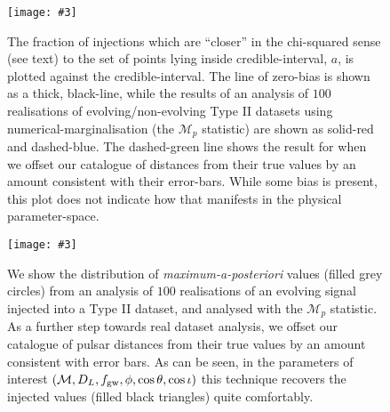 \documentclass[twocolappendix,tighten]{emulateapj}
\newcommand{\incgraph}[3]{\texttt{[image: \#3]}}
\begin{document}
\begin{figure}
  \centering
  \incgraph{0}{0.5}{P-P_plot_Version4.pdf}
   \caption{\label{fig:T4pp}The fraction of injections which are ``closer'' in the chi-squared sense (see text) to the set of points lying inside credible-interval, $a$, is plotted against the credible-interval. The line of zero-bias is shown as a thick, black-line, while the results of an analysis of $100$ realisations of evolving/non-evolving Type II datasets using numerical-marginalisation (the {\bf $\mathcal{M}_p$} statistic) are shown as solid-red and dashed-blue. The dashed-green line shows the result for when we offset our catalogue of distances from their true values by an amount consistent with their error-bars. While some bias is present, this plot does not indicate how that manifests in the physical parameter-space.} 
 \end{figure}


\begin{figure*}
  \centering
\incgraph{0}{0.8}{M7e8_Fgw2m8_SNR8_MaxPost_WrongDist.pdf}
\caption{\label{fig:MaxPost2}%
We show the distribution of {\it maximum-a-posteriori} values (filled grey circles) from an analysis of $100$ realisations of an evolving signal injected into a Type II dataset, and analysed with the {\bf $\mathcal{M}_p$} statistic. As a further step towards real dataset analysis, we offset our catalogue of pulsar distances from their true values by an amount consistent with error bars. As can be seen, in the parameters of interest $(\mathcal{M},D_L,f_{\rm gw},\phi,\cos\theta,\cos\iota)$ this technique recovers the injected values (filled black triangles) quite comfortably.} 
 \end{figure*}
\end{document}
